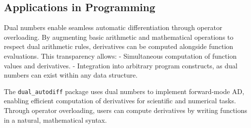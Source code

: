 \documentclass[a4paper,12pt]{article}
\begin{document}
\subsection{Applications in Programming}

Dual numbers enable seamless automatic differentiation through operator overloading. By augmenting basic arithmetic and mathematical operations to respect dual arithmetic rules, derivatives can be computed alongside function evaluations. This transparency allows:
- Simultaneous computation of function values and derivatives.
- Integration into arbitrary program constructs, as dual numbers can exist within any data structure.

The \texttt{dual\_autodiff} package uses dual numbers to implement forward-mode AD, enabling efficient computation of derivatives for scientific and numerical tasks. Through operator overloading, users can compute derivatives by writing functions in a natural, mathematical syntax.

\printbibliography
\end{document}
